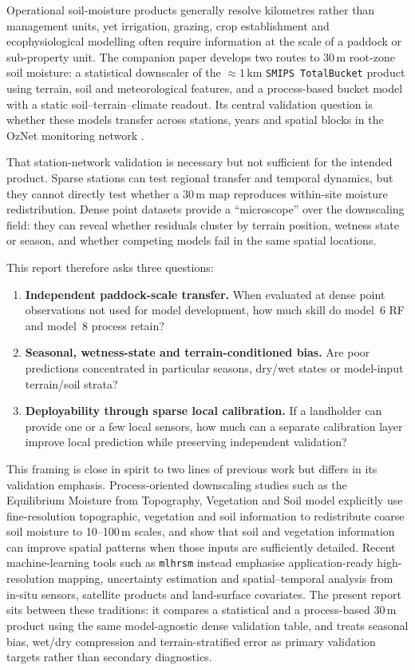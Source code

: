 \documentclass[11pt,a4paper]{article}
\newcommand{\modelSix}{model~6 RF}
\newcommand{\modelEight}{model~8 process}
\newcommand{\smips}{\texttt{SMIPS TotalBucket}}
\begin{document}
Operational soil-moisture products generally resolve kilometres rather than
management units, yet irrigation, grazing, crop establishment
and ecophysiological modelling often require information at the scale of a
paddock or sub-property unit.  The companion paper develops two routes to
30\,m root-zone soil moisture: a statistical downscaler of the
${\approx}1$\,km \smips{} product using terrain, soil and meteorological
features, and a process-based bucket model with a static soil--terrain--climate
readout.  Its central validation question is whether these models transfer
across stations, years and spatial blocks in the OzNet monitoring network
\citep{smith2012oznet}.

That station-network validation is necessary but not sufficient for the
intended product.  Sparse stations can test regional transfer and temporal
dynamics, but they cannot directly test whether a 30\,m map reproduces
within-site moisture redistribution.  Dense point datasets provide a
``microscope'' over the downscaling field: they can reveal whether residuals
cluster by terrain position, wetness state or season, and whether competing
models fail in the same spatial locations.

This report therefore asks three questions:

\begin{enumerate}
\item \textbf{Independent paddock-scale transfer.}  When evaluated at dense
  point observations not used for model development, how much skill do
  \modelSix{} and \modelEight{} retain?
\item \textbf{Seasonal, wetness-state and terrain-conditioned bias.}  Are poor
  predictions concentrated in particular seasons, dry/wet states or
  model-input terrain/soil strata?
\item \textbf{Deployability through sparse local calibration.}  If a landholder
  can provide one or a few local sensors, how much can a separate calibration
  layer improve local prediction while preserving independent validation?
\end{enumerate}

This framing is close in spirit to two lines of previous work but differs in
its validation emphasis.  Process-oriented downscaling studies such as the
Equilibrium Moisture from Topography, Vegetation and Soil model
\citep[EMT+VS;][]{ranney2015emtvs} explicitly use fine-resolution topographic,
vegetation and soil information to redistribute coarse soil moisture to
10--100\,m scales, and show that soil and vegetation information can improve
spatial patterns when those inputs are sufficiently detailed.  Recent
machine-learning tools such as \texttt{mlhrsm} \citep{peng2024mlhrsm} instead
emphasise application-ready high-resolution mapping, uncertainty estimation and
spatial--temporal analysis from in-situ sensors, satellite products and
land-surface covariates.  The present report sits between these traditions: it
compares a statistical and a process-based 30\,m product using the same
model-agnostic dense validation table, and treats seasonal bias, wet/dry
compression and terrain-stratified error as primary validation targets rather
than secondary diagnostics.
\end{document}
